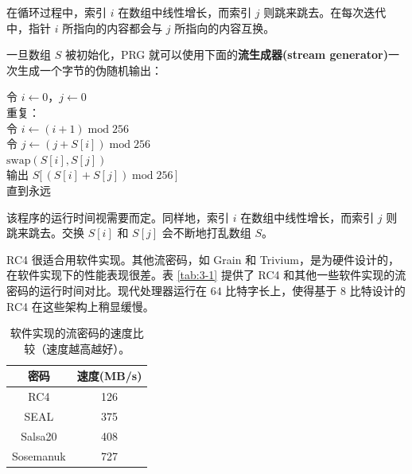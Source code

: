 \vspace*{5pt}

在循环过程中，索引 $i$ 在数组中线性增长，而索引 $j$ 则跳来跳去。在每次迭代中，指针 $i$ 所指向的内容都会与 $j$ 所指向的内容互换。

一旦数组 $S$ 被初始化，PRG 就可以使用下面的\textbf{流生成器(stream generator)}一次生成一个字节的伪随机输出：

\vspace*{5pt}

\hspace*{5pt} 令 $i\leftarrow0$，$j\leftarrow0$\\
\hspace*{26pt} 重复：\\
\hspace*{50pt} 令 $i\leftarrow(i+1) \;\mathrm{mod}\;256$\\
\hspace*{50pt} 令 $j\leftarrow(j+S[i])\;\mathrm{mod}\;256$\\
\hspace*{50pt} $\mathrm{swap}(S[i],S[j])$ \\
\hspace*{50pt} 输出 $S\big[\,(S[i]+S[j])\;\mathrm{mod}\;256\,\big]$ \\
\hspace*{26pt} 直到永远

\vspace*{5pt}

该程序的运行时间视需要而定。同样地，索引 $i$ 在数组中线性增长，而索引 $j$ 则跳来跳去。交换 $S[i]$ 和 $S[j]$ 会不断地打乱数组 $S$。

\begin{snote}[RC4的加密速度。]
RC4 很适合用软件实现。其他流密码，如 Grain 和 Trivium，是为硬件设计的，在软件实现下的性能表现很差。表 \ref{tab:3-1} 提供了 RC4 和其他一些软件实现的流密码的运行时间对比。现代处理器运行在 $64$ 比特字长上，使得基于 $8$ 比特设计的 RC4 在这些架构上稍显缓慢。
\end{snote}

\begin{table}
  \centering
  \begin{tabular}{|c|c|}
    \hline
    密码 & 速度\footnotemark[1](MB/s)\\
    \hline
    RC4 & 126\\
    SEAL & 375\\
    Salsa20 & 408\\
    Sosemanuk & 727\\
    \hline
  \end{tabular}
  \caption{软件实现的流密码的速度比较（速度越高越好）。}
\end{table}

